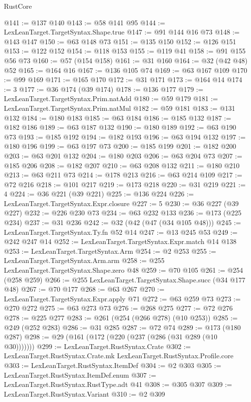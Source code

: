 \begin{lexlean}{RustCore}
\begin{coremodule}
@141 := @137 @140
@143 := @58 @141 @95
@144 := LexLeanTarget.TargetSyntax.Shape.true
@147 := @91 @144 @16 @73
@148 := @143 @147
@150 := @63 @148 @73
@151 := @135 @150
@152 := @126 @151
@153 := @122 @152
@154 := @118 @153
@155 := @119 @41
@158 := @91 @155 @56 @73
@160 := @57 (@154 @158)
@161 := @31 @160
@164 := @32 (@42 @48) @52
@165 := @164 @16
@167 := @136 @105 @74
@169 := @63 @167 @109
@170 := @99 @169
@171 := @165 @170
@172 := @31 @171
@173 := @164 @14
@174 := 3
@177 := @36 @174 (@39 @174)
@178 := @136 @177
@179 := LexLeanTarget.TargetSyntax.Prim.natAdd
@180 := @59 @179
@181 := LexLeanTarget.TargetSyntax.Prim.natMul
@182 := @59 @181
@183 := @131 @132
@184 := @180 @183
@185 := @63 @184
@186 := @185 @132
@187 := @182 @186
@189 := @63 @187 @132
@190 := @180 @189
@192 := @63 @190 @73
@193 := @185 @192
@194 := @182 @193
@196 := @63 @194 @132
@197 := @180 @196
@199 := @63 @197 @73
@200 := @185 @199
@201 := @182 @200
@203 := @63 @201 @132
@204 := @180 @203
@206 := @63 @204 @73
@207 := @185 @206
@208 := @182 @207
@210 := @63 @208 @132
@211 := @180 @210
@213 := @63 @211 @73
@214 := @178 @213
@216 := @63 @214 @109
@217 := @72 @216
@218 := @101 @217
@219 := @173 @218
@220 := @31 @219
@221 := 4
@224 := @36 @221 (@39 @221)
@225 := @136 @224
@226 := LexLeanTarget.TargetSyntax.Expr.closure
@227 := 5
@230 := @36 @227 (@39 @227)
@232 := @226 @230 @73
@234 := @63 @232 @133
@236 := @173 (@225 @234)
@237 := @31 @236
@242 := @32 (@42 (@47 (@34 @105 @48)))
@245 := LexLeanTarget.TargetSyntax.Ty.fn @52 @14
@247 := @13 @245 @53
@249 := @242 @247 @14
@252 := LexLeanTarget.TargetSyntax.Expr.match @14 @138
@253 := LexLeanTarget.TargetSyntax.Arm
@254 := @2 @253
@255 := LexLeanTarget.TargetSyntax.Arm.arm
@258 := @255 LexLeanTarget.TargetSyntax.Shape.zero @48
@259 := @70 @105
@261 := @254 (@258 @259)
@266 := @255 LexLeanTarget.TargetSyntax.Shape.succ (@34 @177 @48)
@267 := @70 @177
@268 := @63 @267
@270 := LexLeanTarget.TargetSyntax.Expr.apply @71
@272 := @63 @259 @73
@273 := @270 @272
@275 := @63 @273 @73
@276 := @268 @275
@277 := @72 @276
@278 := @225 @277
@283 := @261 (@254 (@266 @278) (@10 @253))
@285 := @249 (@252 @283)
@286 := @31 @285
@287 := @72 @74
@289 := @173 (@180 @287)
@298 := @29 (@161 (@172 (@220 (@237 (@286 (@31 @289 (@10 @30)))))))
@299 := LexLeanTarget.RustSyntax.Crate
@302 := LexLeanTarget.RustSyntax.Crate.mk LexLeanTarget.RustSyntax.Profile.core
@303 := LexLeanTarget.RustSyntax.ItemDef
@304 := @2 @303
@305 := LexLeanTarget.RustSyntax.ItemDef.enum
@307 := LexLeanTarget.RustSyntax.RustType.adt @41
@308 := @305 @307
@309 := LexLeanTarget.RustSyntax.Variant
@310 := @2 @309

\end{coremodule}
\end{lexlean}
